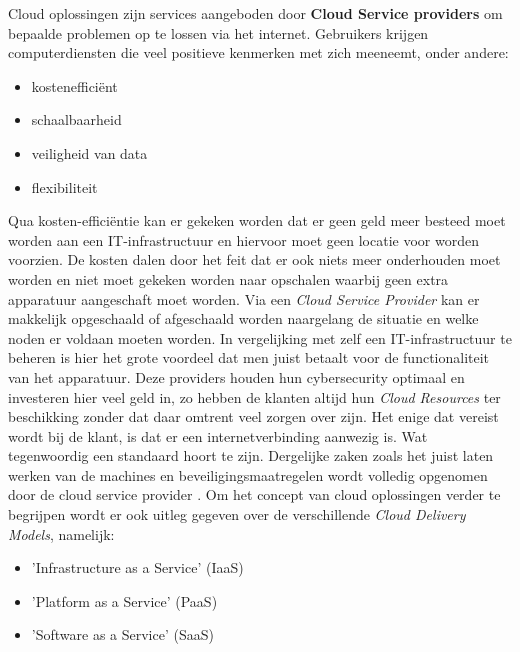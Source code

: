 Cloud oplossingen zijn services aangeboden door \textbf{Cloud Service providers} om bepaalde problemen op te lossen via het internet. Gebruikers krijgen computerdiensten die veel positieve kenmerken met zich meeneemt, onder andere:

\begin{itemize}
    \item kostenefficiënt
    \item schaalbaarheid
    \item veiligheid van data
    \item flexibiliteit
\end{itemize}

Qua kosten-efficiëntie kan er gekeken worden dat er geen geld meer besteed moet worden aan een IT-infrastructuur en hiervoor moet geen locatie voor worden voorzien. De kosten dalen door het feit dat er ook niets meer onderhouden moet worden en niet moet gekeken worden naar opschalen waarbij geen extra apparatuur aangeschaft moet worden. Via een \textit{Cloud Service Provider} kan er makkelijk opgeschaald of afgeschaald worden naargelang de situatie en welke noden er voldaan moeten worden. In vergelijking met zelf een IT-infrastructuur te beheren is hier het grote voordeel dat men juist betaalt voor de functionaliteit van het apparatuur. Deze providers houden hun cybersecurity optimaal en investeren hier veel geld in, zo hebben de klanten altijd hun \textit{Cloud Resources} ter beschikking zonder dat daar omtrent veel zorgen over zijn. Het enige dat vereist wordt bij de klant, is dat er een internetverbinding aanwezig is. Wat tegenwoordig een standaard hoort te zijn. Dergelijke zaken zoals het juist laten werken van de machines en beveiligingsmaatregelen wordt volledig opgenomen door de cloud service provider \autocite{WouterCloudInvest2020}. Om het concept van cloud oplossingen verder te begrijpen wordt er ook uitleg gegeven over de verschillende \textit{Cloud Delivery Models}, namelijk:

\begin{itemize}
    \item 'Infrastructure as a Service' (IaaS)
    \item 'Platform as a Service' (PaaS)
    \item 'Software as a Service' (SaaS)
\end{itemize}

